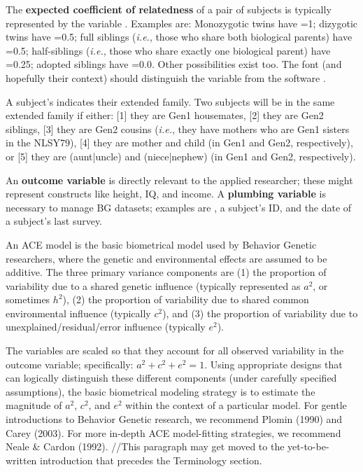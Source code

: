 \documentclass{article}\usepackage[]{graphicx}\usepackage[]{color}
\begin{document}
The \textbf{expected coefficient of relatedness} of a pair of subjects is typically represented by the variable .  Examples are: Monozygotic twins have =1; dizygotic twins have =0.5; full siblings (\emph{i.e.}, those who share both biological parents) have =0.5;  half-siblings (\emph{i.e.}, those who share exactly one biological parent) have =0.25; adopted siblings have =0.0.  Other possibilities exist too.  The font (and hopefully their context) should distinguish the variable  from the software \R{}.

A subject's  indicates their extended family.  Two subjects will be in the same extended family if either: [1] they are Gen1 housemates, [2] they are Gen2 siblings, [3] they are Gen2 cousins (\emph{i.e.}, they have mothers who are Gen1 sisters in the NLSY79), [4] they are mother and child (in Gen1 and Gen2, respectively), or [5] they are (aunt|uncle) and (niece|nephew) (in Gen1 and Gen2, respectively).

An \textbf{outcome variable} is directly relevant to the applied researcher; these might represent constructs like height, IQ, and income.  A \textbf{plumbing variable} is necessary to manage BG datasets; examples are , a subject's ID, and the date of a subject's last survey.

An ACE model is the basic biometrical model used by Behavior Genetic researchers, where the genetic and environmental effects are assumed to be additive. The three primary variance components are (1) the proportion of variability due to a shared genetic influence (typically represented as $a^2$, or sometimes $h^2$), (2) the proportion of variability due to shared common environmental influence (typically $c^2$), and (3) the proportion of variability due to unexplained/residual/error influence (typically $e^2$).  

The variables are scaled so that they account for all observed variability in the outcome variable; specifically: $a^2 + c^2 + e^2 = 1$.  Using appropriate designs that can logically distinguish these different components (under carefully specified assumptions), the basic biometrical modeling strategy is to estimate the magnitude of $a^2$, $c^2$, and $e^2$ within the context of a particular model. For gentle introductions to Behavior Genetic research, we recommend Plomin (1990) and Carey (2003).  For more in-depth ACE model-fitting strategies, we recommend Neale \& Cardon (1992). 
//This paragraph may get moved to the yet-to-be-written introduction that precedes the Terminology section.
\end{document}
